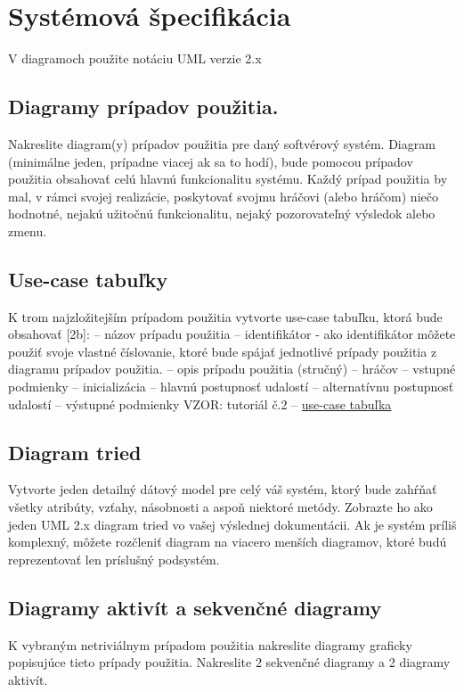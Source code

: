 
\section{Systémová špecifikácia}
V diagramoch použite notáciu UML verzie 2.x

\subsection{Diagramy prípadov použitia.}
Nakreslite diagram(y) prípadov použitia pre daný softvérový
systém. Diagram (minimálne jeden, prípadne viacej ak sa to hodí), bude pomocou prípadov
použitia obsahovať celú hlavnú funkcionalitu systému. Každý prípad použitia by mal, v rámci
svojej realizácie, poskytovať svojmu hráčovi (alebo hráčom) niečo hodnotné, nejakú užitočnú
funkcionalitu, nejaký pozorovateľný výsledok alebo zmenu.

\subsection{Use-case tabuľky}
K trom najzložitejším prípadom použitia vytvorte use-case tabuľku, ktorá
bude obsahovať [2b]:
– názov prípadu použitia
– identifikátor - ako identifikátor môžete použiť svoje vlastné číslovanie, ktoré bude
spájať jednotlivé prípady použitia z diagramu prípadov použitia.
– opis prípadu použitia (stručný)
– hráčov
– vstupné podmienky
– inicializácia
– hlavnú postupnosť udalostí
– alternatívnu postupnosť udalostí
– výstupné podmienky
VZOR: tutoriál č.2 – \href{https://uim.fei.stuba.sk/wp-content/uploads/2022/09/CV2-USC_tabulka_TUTORIAL.pdf}{use-case tabuľka}

\subsection{Diagram tried}
Vytvorte jeden detailný dátový model pre celý váš systém, ktorý bude zahŕňať
všetky atribúty, vzťahy, násobnosti a aspoň niektoré metódy. Zobrazte ho ako jeden UML 2.x
diagram tried vo vašej výslednej dokumentácii. Ak je systém príliš komplexný, môžete rozčleniť
diagram na viacero menších diagramov, ktoré budú reprezentovať len príslušný podsystém.

\subsection{Diagramy aktivít a sekvenčné diagramy}
K vybraným netriviálnym prípadom použitia nakreslite
diagramy graficky popisujúce tieto prípady použitia. Nakreslite 2 sekvenčné diagramy a 2
diagramy aktivít.

